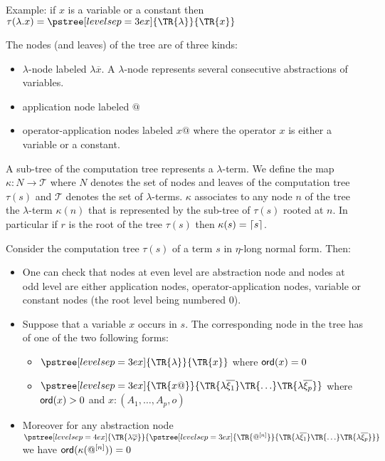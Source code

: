 Example: if $x$ is a variable or a constant then
$ \cmptre{\lambda . x} =
  \pstree[levelsep=3ex]
    { \TR{\lambda } }
    { \TR{x}
    }$

The nodes (and leaves) of the tree are of three kinds:
\begin{itemize}
\item $\lambda$-node labeled $\lambda \overline{x}$. A $\lambda$-node represents several consecutive abstractions of variables.
\item application node labeled $@$
\item operator-application nodes labeled $x @$ where the operator $x$ is
either a variable or a constant.
\end{itemize}

A sub-tree of the computation tree represents a $\lambda$-term. We
define the map $\kappa : N \rightarrow \mathcal{T}$ where $N$
denotes the set of nodes and leaves of the computation tree
$\tau(s)$ and $\mathcal{T}$ denotes the set of $\lambda$-terms.
$\kappa$ associates to any node $n$ of the tree the $\lambda$-term
$\kappa(n)$ that is represented by the sub-tree of $\tau(s)$ rooted
at $n$. In particular if $r$ is the root of the tree $\tau(s)$ then
$\kappa(s) = \lceil s\rceil$.



Consider the computation tree $\tau(s)$ of a term $s$ in $\eta$-long normal form. Then:
\begin{itemize}
\item One can check that nodes at even level are abstraction
node and nodes at odd level are either application nodes,
operator-application nodes, variable or constant nodes (the root level being numbered $0$).

\item Suppose that a variable $x$ occurs in $s$. The corresponding node in the tree has of one of the two following forms:
    \begin{itemize}
    \item $ \pstree[levelsep=3ex]
        { \TR{\lambda } }
        { \TR{x}
        }$ where ${\sf ord}(x) = 0$

    \item $ \pstree[levelsep=3ex]
                { \TR{x @} }
                { \TR{\lambda \overline{\xi_1}} \TR{\ldots} \TR{\lambda \overline{\xi_p}}}
        $ where ${\sf ord}(x) > 0$ and $x:(A_1,\ldots,A_p,o)$
    \end{itemize}

\item    Moreover for any abstraction node
        $ \pstree[levelsep=4ex]
            { \TR{\lambda \overline{\varphi}} }
            { \pstree[levelsep=3ex]
                {\TR{@^{[n]}}}
                {\TR{\lambda \overline{\xi_1}} \TR{\ldots} \TR{\lambda \overline{\xi_p}}}
            }
        $
    we have ${\sf ord}(\kappa(@^{[n]}))=0$

\end{itemize}


